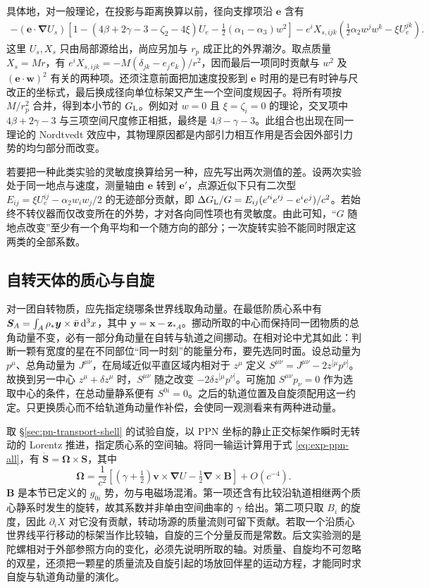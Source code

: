 具体地，对一般理论，在投影与距离换算以前，径向支撑项沿 $\bm e$ 含有
\begin{align*}
 -(\bm e\cdot\bm\nabla U_s)
 \left[1-(4\beta+2\gamma-3-\zeta_2-4\xi)U_e
                 -\tfrac12(\alpha_1-\alpha_3)w^2\right]
 -e^i X_{s,ijk}(\tfrac12\alpha_2w^jw^k-\xi U_e^{jk}).
\end{align*}
这里 $U_s,X_s$ 只由局部源给出，尚应另加与 $r_p$ 成正比的外界潮汐。取点质量 $X_s=Mr$，有 $e^iX_{s,ijk}=-M(\delta_{jk}-e_je_k)/r^2$，因而最后一项同时贡献与 $w^2$ 及 $(\bm e\cdot\bm w)^2$ 有关的两种项。还须注意前面把加速度投影到 $\bm e$ 时用的是已有时钟与尺改正的坐标式，最后换成径向单位标架又产生一个空间度规因子。将所有项按 $M/r_p^2$ 合并，得到本小节的 $G_{\rm L}$。例如对 $w=0$ 且 $\xi=\zeta_i=0$ 的理论，交叉项中 $4\beta+2\gamma-3$ 与三项空间尺度修正相抵，最终是 $4\beta-\gamma-3$。此组合也出现在同一理论的 Nordtvedt 效应中，其物理原因都是内部引力相互作用是否会因外部引力势的均匀部分而改变。

若要把一种此类实验的灵敏度换算给另一种，应先写出两次测值的差。设两次实验处于同一地点与速度，测量轴由 $\bm e$ 转到 $\bm e'$，点源近似下只有二次型 $E_{ij}=\xi U_e^{ij}-\alpha_2w_iw_j/2$ 的无迹部分贡献，即 $\Delta G_{\rm L}/G=E_{ij}(e'^ie'^j-e^ie^j)/c^2$。若始终不转仪器而仅改变所在的外势，才对各向同性项也有灵敏度。由此可知，“$G$ 随地点改变”至少有一个角平均和一个随方向的部分；一次旋转实验不能同时限定这两类的全部系数。

\subsection{自转天体的质心与自旋}

对一团自转物质，应先指定绕哪条世界线取角动量。在最低阶质心系中有 $\bm S_A=\int_A\rho_*\bm y\times\bar{\bm v}\,\dd^3x$，其中 $\bm y=\bm x-\bm z_{*A}$。挪动所取的中心而保持同一团物质的总角动量不变，必有一部分角动量在自转与轨道之间挪动。在相对论中尤其如此：判断一颗有宽度的星在不同部位“同一时刻”的能量分布，要先选同时面。设总动量为 $p^\mu$、总角动量为 $J^{\mu\nu}$，在局域近似平直区域内相对于 $z^\mu$ 定义 $S^{\mu\nu}=J^{\mu\nu}-2z^{[\mu}p^{\nu]}$。故换到另一中心 $z^\mu+\delta z^\mu$ 时，$S^{\mu\nu}$ 随之改变 $-2\delta z^{[\mu}p^{\nu]}$。可施加 $S^{\mu\nu}p_\nu=0$ 作为选取中心的条件，在总动量静系便有 $S^{0i}=0$。之后的轨道位置及自旋须配用这一约定。只更换质心而不给轨道角动量作补偿，会使同一观测看来有两种进动量。

取 \S\ref{sec:pn-transport-shell} 的试验自旋，以 PPN 坐标的静止正交标架作瞬时无转动的 Lorentz 推进，指定质心系的空间轴。将同一输运计算用于式 \eqref{eq:exp-ppn-all}，有 $\dot{\bm S}=\bm\Omega\times\bm S$，其中
\[
 \bm\Omega=\frac{1}{c^2}
 \left[(\gamma+\tfrac12)\bm v\times\bm\nabla U
                     -\tfrac12\bm\nabla\times\bm B\right]+O(c^{-4}).
\]
$\bm B$ 是本节已定义的 $g_{0i}$ 势，勿与电磁场混淆。第一项还含有比较沿轨道相继两个质心静系时发生的旋转，故其系数并非单由空间曲率的 $\gamma$ 给出。第二项只取 $B_i$ 的旋度，因此 $\partial_i\dot X$ 对它没有贡献，转动场源的质量流则可留下贡献。若取一个沿质心世界线平行移动的标架当作比较轴，自旋的三个分量反而是常数。后文实验测的是陀螺相对于外部参照方向的变化，必须先说明所取的轴。对质量、自旋均不可忽略的双星，还须把一颗星的质量流及自旋引起的场放回伴星的运动方程，才能同时求自旋与轨道角动量的演化。

